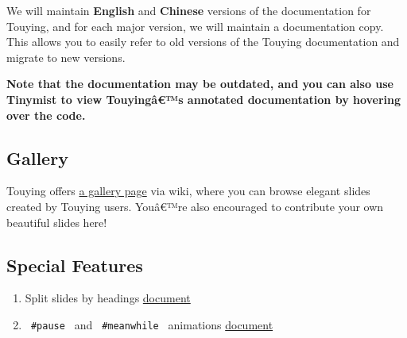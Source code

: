 We will maintain \textbf{English} and \textbf{Chinese} versions of the
documentation for Touying, and for each major version, we will maintain
a documentation copy. This allows you to easily refer to old versions of
the Touying documentation and migrate to new versions.

\textbf{Note that the documentation may be outdated, and you can also
use Tinymist to view Touyingâ€™s annotated documentation by hovering
over the code.}

\subsection{Gallery}\label{gallery}

Touying offers \href{https://github.com/touying-typ/touying/wiki}{a
gallery page} via wiki, where you can browse elegant slides created by
Touying users. Youâ€™re also encouraged to contribute your own beautiful
slides here!

\subsection{Special Features}\label{special-features}

\begin{enumerate}
\tightlist
\item
  Split slides by headings
  \href{https://touying-typ.github.io/docs/sections}{document}
\end{enumerate}

\begin{Shaded}
\begin{Highlighting}[]





\end{Highlighting}
\end{Shaded}

\begin{enumerate}
\setcounter{enumi}{1}
\tightlist
\item
  \texttt{\ \#pause\ } and \texttt{\ \#meanwhile\ } animations
  \href{https://touying-typ.github.io/docs/dynamic/simple}{document}
\end{enumerate}

\begin{Shaded}
\begin{Highlighting}[]
\NormalTok{\#slide[}






\NormalTok{]}
\end{Highlighting}
\end{Shaded}

